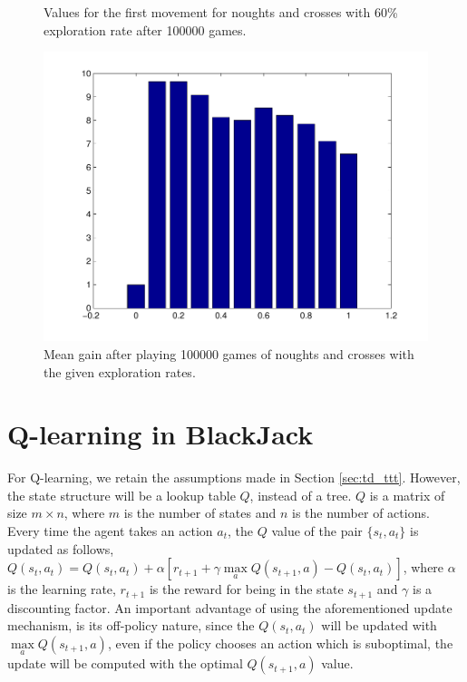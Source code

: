 \documentclass[12pt]{article}
\begin{document}
\begin{figure}[htbp!]
\begin{minipage}[t]{0.5\linewidth}
	\caption{Values for the first movement for noughts and crosses with 60\% exploration rate after 100000 games.}
	\label{fig:ttt_eps_0_6}
\end{minipage} 
\quad
\begin{minipage}[t]{0.45\linewidth}
	\includegraphics[scale=0.40]{images/tttExpectedGain}
	\caption{Mean gain after playing 100000 games of noughts and crosses with the given exploration rates.}
	\label{fig:tttExpectedGain}
\end{minipage}
\end{figure}

\section{Q-learning in BlackJack}

For Q-learning\cite{Sutton1998}, we retain the assumptions made in Section \ref{sec:td_ttt}.
However, the state structure will be a lookup table $Q$, instead of a tree.
$Q$ is a matrix of size $m \times n$, where $m$ is the number of states and $n$ is the number of actions.
Every time the agent takes an action $a_t$, the $Q$ value of the pair $\lbrace s_t, a_t \rbrace$ is updated as follows, $Q(s_t,a_t) = Q(s_t,a_t) + \alpha \left[ r_{t+1} + \gamma \max\limits_a Q(s_{t+1},a) - Q(s_t,a_t) \right]$, where $\alpha$ is the learning rate, $r_{t+1}$ is the reward for being in the state $s_{t+1}$ and $\gamma$ is a discounting factor.
An important advantage of using the aforementioned update mechanism, is its off-policy nature, since the $Q(s_t,a_t)$ will be updated with $\max\limits_a Q(s_{t+1},a)$, even if the policy chooses an action which is suboptimal, the update will be computed with the optimal $Q(s_{t+1},a)$ value.
\end{document}
